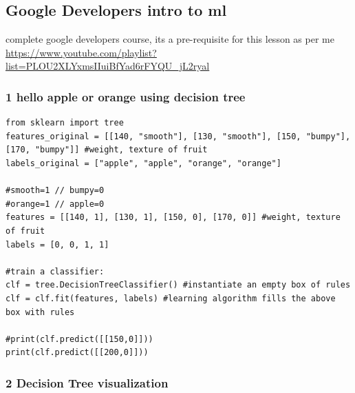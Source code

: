 \documentclass[11pt]{article}
\begin{document}
\subsection{Google Developers intro to ml}
\label{sec:orgc5c9ac0}
complete google developers course, its a pre-requisite for this lesson as per me
\url{https://www.youtube.com/playlist?list=PLOU2XLYxmsIIuiBfYad6rFYQU\_jL2ryal}

\subsubsection{1 hello apple or orange using decision tree}
\label{sec:org2abc486}
\begin{verbatim}
from sklearn import tree
features_original = [[140, "smooth"], [130, "smooth"], [150, "bumpy"], [170, "bumpy"]] #weight, texture of fruit
labels_original = ["apple", "apple", "orange", "orange"]

#smooth=1 // bumpy=0
#orange=1 // apple=0
features = [[140, 1], [130, 1], [150, 0], [170, 0]] #weight, texture of fruit
labels = [0, 0, 1, 1]

#train a classifier: 
clf = tree.DecisionTreeClassifier() #instantiate an empty box of rules
clf = clf.fit(features, labels) #learning algorithm fills the above box with rules

#print(clf.predict([[150,0]]))
print(clf.predict([[200,0]]))
\end{verbatim}


\subsubsection{2 Decision Tree visualization}
\label{sec:org7e20593}
\end{document}
